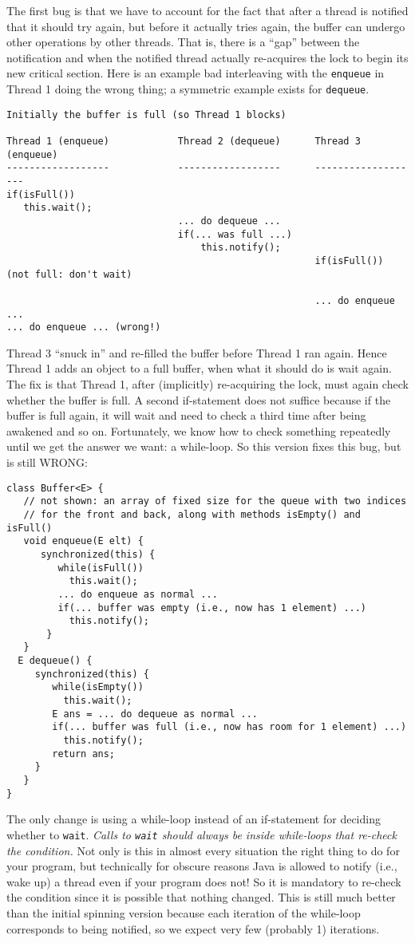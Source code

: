 \documentclass[10pt]{article}
\begin{document}
The first bug is that we have to account for the fact that after a
thread is notified that it should try again, but before it actually
tries again, the buffer can undergo other operations by other
threads.  That is, there is a ``gap'' between the notification and
when the notified thread actually re-acquires the lock to begin its
new critical section.  Here is an example bad interleaving with the
{\tt enqueue} in Thread 1 doing the wrong thing; a symmetric example
exists for {\tt dequeue}.
\goodbreak
\begin{verbatim}
Initially the buffer is full (so Thread 1 blocks)

Thread 1 (enqueue)            Thread 2 (dequeue)      Thread 3 (enqueue)
------------------            ------------------      -------------------
if(isFull())
   this.wait();
                              ... do dequeue ...
                              if(... was full ...)
                                  this.notify();
                                                      if(isFull()) (not full: don't wait)
 
                                                      ... do enqueue ...           
... do enqueue ... (wrong!)
\end{verbatim}
Thread 3 ``snuck in'' and re-filled the buffer before Thread 1 ran again.
Hence Thread 1 adds an object to a full buffer, when what it should do
is wait again.  The fix is that Thread 1, after (implicitly)
re-acquiring the lock, must again check whether the buffer is full.  A
second if-statement does not suffice because if the buffer is full
again, it will wait and need to check a third time after being awakened
and so on.  Fortunately, we know how to check something repeatedly
until we get the answer we want: a while-loop.  So this version fixes
this bug, but is still WRONG:
\begin{verbatim}
class Buffer<E> {
   // not shown: an array of fixed size for the queue with two indices
   // for the front and back, along with methods isEmpty() and isFull()
   void enqueue(E elt) {
      synchronized(this) {
         while(isFull())
           this.wait();    
         ... do enqueue as normal ...
         if(... buffer was empty (i.e., now has 1 element) ...)
           this.notify();
       }
   }
  E dequeue() {
     synchronized(this) {
        while(isEmpty())
          this.wait();
        E ans = ... do dequeue as normal ...
        if(... buffer was full (i.e., now has room for 1 element) ...)
          this.notify();
        return ans;
     }
   }
}
\end{verbatim}
The only change is using a while-loop instead of an if-statement for
deciding whether to {\tt wait}.  \emph{Calls to {\tt wait} should
  always be inside while-loops that re-check the condition.}  Not only
is this in almost every situation the right thing to do for your
program, but technically for obscure reasons Java is allowed to notify
(i.e., wake up) a thread even if your program does not!  So it is
mandatory to re-check the condition since it is possible that nothing
changed.  This is still much better than the initial spinning version
because each iteration of the while-loop corresponds to being
notified, so we expect very few (probably 1) iterations.
\end{document}
